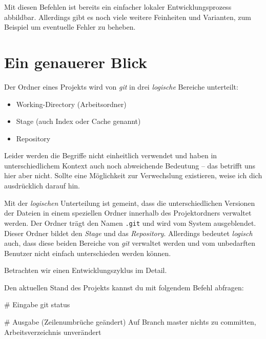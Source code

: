 \documentclass[
  letterpaper,
  DIV=11]{scrreprt}
\newenvironment{Shaded}{\begin{snugshade}}{\end{snugshade}}
\newcommand{\CommentTok}[1]{\textcolor[rgb]{0.37,0.37,0.37}{#1}}
\newcommand{\ExtensionTok}[1]{\textcolor[rgb]{0.00,0.23,0.31}{#1}}
\newcommand{\FunctionTok}[1]{\textcolor[rgb]{0.28,0.35,0.67}{#1}}
\newcommand{\NormalTok}[1]{\textcolor[rgb]{0.00,0.23,0.31}{#1}}
\providecommand{\tightlist}{%
  \setlength{\itemsep}{0pt}\setlength{\parskip}{0pt}}\usepackage{longtable,booktabs,array}
\newcommand{\git}{\textit{git}\xspace}
\begin{document}
Mit diesen Befehlen ist bereits ein einfacher lokaler
Entwicklungsprozess abbildbar. Allerdings gibt es noch viele weitere
Feinheiten und Varianten, zum Beispiel um eventuelle Fehler zu beheben.

\section{Ein genauerer Blick}\label{ein-genauerer-blick}

Der Ordner eines Projekts wird von \git in drei \emph{logische} Bereiche
unterteilt:

\begin{itemize}
\tightlist
\item
  Working-Directory (Arbeitsordner)
\item
  Stage (auch Index oder Cache genannt)
\item
  Repository
\end{itemize}

Leider werden die Begriffe nicht einheitlich verwendet und haben in
unterschiedlichem Kontext auch noch abweichende Bedeutung -- das
betrifft uns hier aber nicht. Sollte eine Möglichkeit zur Verwechslung
existieren, weise ich dich ausdrücklich darauf hin.

Mit der \emph{logischen} Unterteilung ist gemeint, dass die
unterschiedlichen Versionen der Dateien in einem speziellen Ordner
innerhalb des Projektordners verwaltet werden. Der Ordner trägt den
Namen \texttt{.git} und wird vom System ausgeblendet. Dieser Ordner
bildet den \emph{Stage} und das \emph{Repository}. Allerdings bedeutet
\emph{logisch} auch, dass diese beiden Bereiche von \git verwaltet
werden und vom unbedarften Benutzer nicht einfach unterschieden werden
können.

Betrachten wir einen Entwicklungszyklus im Detail.

Den aktuellen Stand des Projekts kannst du mit folgendem Befehl
abfragen:

\begin{Shaded}
\begin{Highlighting}[]
\CommentTok{\# Eingabe}
\FunctionTok{git}\NormalTok{ status}

\CommentTok{\# Ausgabe (Zeilenumbrüche geändert)}
\ExtensionTok{Auf}\NormalTok{ Branch master}
\ExtensionTok{nichts}\NormalTok{ zu committen, }
\ExtensionTok{Arbeitsverzeichnis}\NormalTok{ unverändert}
\end{Highlighting}
\end{Shaded}
\end{document}
